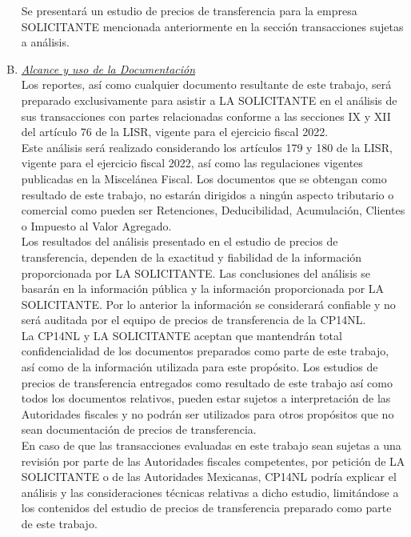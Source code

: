 \documentclass[5pt,letter]{report}
\begin{document}
\begin{enumerate}[A)]
Se presentará un estudio de precios de transferencia para la empresa SOLICITANTE mencionada anteriormente en la sección transacciones sujetas a análisis. 

\item \textit{\underline{Alcance y uso de la Documentación}}\\[5pt] 

Los reportes, así como cualquier documento resultante de este trabajo, será preparado exclusivamente para asistir a LA SOLICITANTE en el análisis de sus transacciones con partes relacionadas conforme a las secciones IX y XII del artículo 76 de la LISR, vigente para el ejercicio fiscal 2022.\\[5pt] 

Este análisis será realizado considerando los artículos 179 y 180 de la LISR, vigente para el ejercicio fiscal 2022, así como las regulaciones vigentes publicadas en la Miscelánea Fiscal. Los documentos que se obtengan como resultado de este trabajo, no estarán dirigidos a ningún aspecto tributario o comercial como pueden ser Retenciones, Deducibilidad, Acumulación, Clientes o Impuesto al Valor Agregado.\\[5pt] 

Los resultados del análisis presentado en el estudio de precios de transferencia, dependen de la exactitud y fiabilidad de la información proporcionada por LA SOLICITANTE. Las conclusiones del análisis se basarán en la información pública y la información proporcionada por LA SOLICITANTE. Por lo anterior la información se considerará confiable y no será auditada por el equipo de precios de transferencia de la \textcolor{principal}{CP14NL}.\\[5pt]

La \textcolor{principal}{CP14NL} y LA SOLICITANTE aceptan que mantendrán total confidencialidad de los documentos preparados como parte de este trabajo, así como de la información utilizada para este propósito. Los estudios de precios de transferencia entregados como resultado de este trabajo así como todos los documentos relativos, pueden estar sujetos a interpretación de las Autoridades fiscales y no podrán ser utilizados para otros propósitos que no sean documentación de precios de transferencia.\\[5pt] 

En caso de que las transacciones evaluadas en este trabajo sean sujetas a una revisión por parte de las Autoridades fiscales competentes, por petición de LA SOLICITANTE o de las Autoridades Mexicanas, \textcolor{principal}{CP14NL} podría explicar el análisis y las consideraciones técnicas relativas a dicho estudio, limitándose a los contenidos del estudio de precios de transferencia preparado como parte de este trabajo. \\[5pt]

\end{enumerate}
\end{document}
